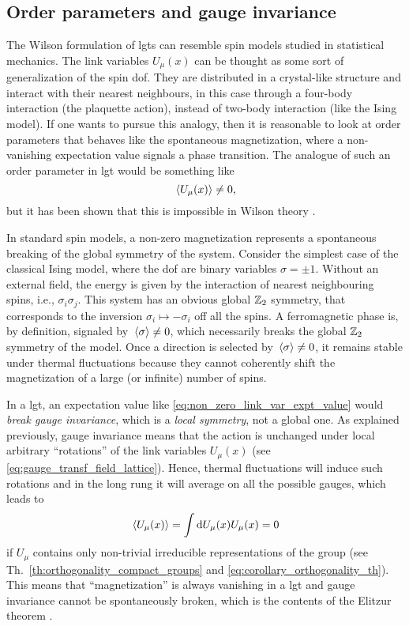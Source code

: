 %
%
\subsection{Order parameters and gauge invariance}
\label{sub:wilson_confinement_test}

The Wilson formulation of \ac{lgt}s can resemble spin models studied in statistical mechanics.
The link variables $U_{\mu}(x)$ can be thought as some sort of generalization of the spin \ac{dof}.
They are distributed in a crystal-like structure and interact with their nearest neighbours, in this case through a four-body interaction (the plaquette action), instead of two-body interaction (like the Ising model).
If one wants to pursue this analogy, then it is reasonable to look at order parameters that behaves like the spontaneous magnetization, where a non-vanishing expectation value signals a phase transition.
The analogue of such an order parameter in \ac{lgt} would be something like
\begin{equation}
    \ev*{U_{\mu}(x)} \neq 0,
    \label{eq:non_zero_link_var_expt_value}
\end{equation}
but it has been shown that this is impossible in Wilson theory \cite{elitzur1975theorem}.

In standard spin models, a non-zero magnetization represents a spontaneous breaking of the global symmetry of the system.
Consider the simplest case of the classical Ising model, where the \ac{dof} are binary variables $\sigma = \pm 1$.
Without an external field, the energy is given by the interaction of nearest neighbouring spins, i.e., $\sigma_i \sigma_j$.
This system has an obvious global $\mathbb{Z}_2$ symmetry, that corresponds to the inversion $\sigma_i \mapsto -\sigma_i$ off all the spins.
A ferromagnetic phase is, by definition, signaled by $\ev*{\sigma} \neq 0$, which necessarily breaks the global $\mathbb{Z}_2$ symmetry of the model.
Once a direction is selected by $\ev*{\sigma} \neq 0$, it remains stable under thermal fluctuations because they cannot coherently shift the magnetization of a large (or infinite) number of spins.

In a \ac{lgt}, an expectation value like \eqref{eq:non_zero_link_var_expt_value} would \emph{break gauge invariance}, which is a \emph{local symmetry}, not a global one.
As explained previously, gauge invariance means that the action is unchanged under local arbitrary ``rotations'' of the link variables $U_{\mu}(x)$ (see \eqref{eq:gauge_transf_field_lattice}).
Hence, thermal fluctuations will induce such rotations and in the long rung it will average on all the possible gauges, which leads to
\begin{equation}
    \ev*{U_{\mu}(x)} = \int \dd U_{\mu}(x) U_{\mu}(x) = 0
\end{equation}
if $U_{\mu}$ contains only non-trivial irreducible representations of the group (see Th.~\ref{th:orthogonality_compact_groups} and \eqref{eq:corollary_orthogonality_th}).
This means that ``magnetization'' is always vanishing in a \ac{lgt} and gauge invariance cannot be spontaneously broken, which is the contents of the Elitzur theorem \cite{elitzur1975theorem}.


